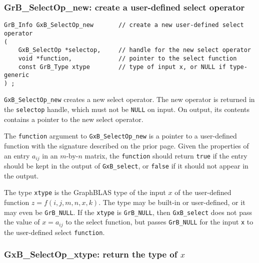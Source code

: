 \documentclass[12pt]{article}
\begin{document}
\subsubsection{{\sf GrB\_SelectOp\_new:} create a user-defined select operator}
\label{selectop_new}

\begin{mdframed}[userdefinedwidth=6in]
{\footnotesize
\begin{verbatim}
GrB_Info GxB_SelectOp_new       // create a new user-defined select operator
(
    GxB_SelectOp *selectop,     // handle for the new select operator
    void *function,             // pointer to the select function
    const GrB_Type xtype        // type of input x, or NULL if type-generic
) ;
\end{verbatim} }\end{mdframed}

\verb'GxB_SelectOp_new' creates a new select operator.  The new operator is
returned in the \verb'selectop' handle, which must not be \verb'NULL' on input.
On output, its contents contains a pointer to the new select operator.

The \verb'function' argument to \verb'GxB_SelectOp_new' is a pointer to a
user-defined function with the signature described on the prior page.  Given
the properties of an entry $a_{ij}$ in an $m$-by-$n$ matrix, the
\verb'function' should return \verb'true' if the entry should be kept in the
output of \verb'GxB_select', or \verb'false' if it should not appear in the
output.

The type \verb'xtype' is the GraphBLAS type of the input $x$ of the
user-defined function $z=f(i,j,m,n,x,k)$.  The type may be built-in or
user-defined, or it may even be \verb'GrB_NULL'.  If the \verb'xtype' is
\verb'GrB_NULL', then \verb'GxB_select' does not pass the value of $x=a_{ij}$
to the select function, but passes \verb'GrB_NULL' for the input \verb'x' to
the user-defined select \verb'function'.

\newpage
\subsubsection{{\sf GxB\_SelectOp\_xtype:} return the type of $x$} 
\label{selectop_xtype}
\end{document}

